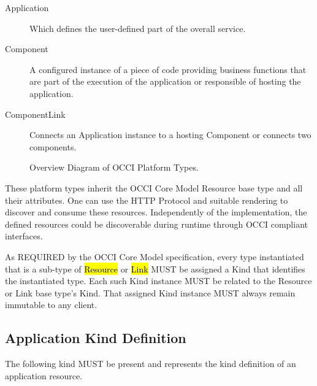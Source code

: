 \documentclass[10pt,a4paper]{article}
\begin{document}
\begin{description}
  \item[Application] Which defines the user-defined part of the overall service.
  \item[Component] A configured instance of a piece of code providing business functions that are part of the execution of the application or responsible of hosting the application.
  \item[ComponentLink] Connects an Application instance to a hosting Component or connects two components.
\end{description}

\begin{figure}[!h]
	{\centering {} \par}
	\caption{Overview Diagram of OCCI Platform Types.}
	\label{fig:platform_uml}
\end{figure}

These platform types inherit the OCCI Core Model Resource base type and all their attributes. One can use the HTTP Protocol and suitable rendering to discover and consume these resources. Independently of the implementation, the defined resources could be discoverable during runtime through OCCI compliant interfaces.

As REQUIRED by the OCCI Core Model specification, every type instantiated that is a  sub-type of \hl{Resource} or \hl{Link} MUST be assigned a Kind that identifies the instantiated type. Each such Kind instance MUST be related to the Resource or Link base type's Kind. That assigned Kind instance MUST always remain immutable to any client.

\subsection{Application Kind Definition}
The following kind MUST be present and represents the kind definition of an application resource.
\end{document}
